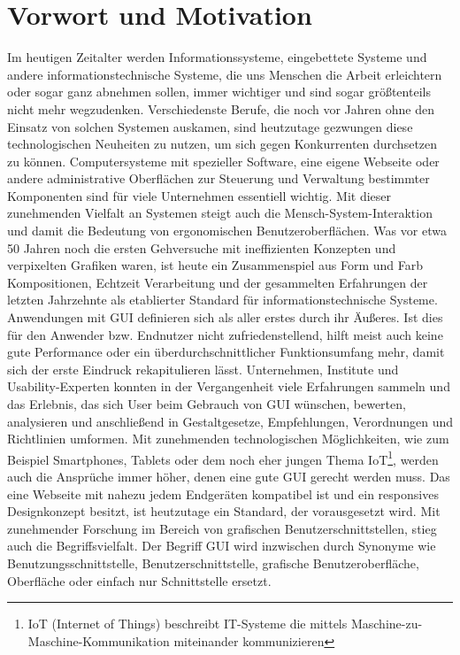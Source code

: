 \section{Vorwort und Motivation}

Im heutigen Zeitalter werden Informationssysteme, eingebettete Systeme und andere informationstechnische Systeme, die uns Menschen die Arbeit erleichtern oder sogar ganz abnehmen sollen, immer wichtiger und sind sogar größtenteils nicht mehr wegzudenken. Verschiedenste Berufe, die noch vor Jahren ohne den Einsatz von solchen Systemen auskamen, sind heutzutage gezwungen diese technologischen Neuheiten zu nutzen, um sich gegen Konkurrenten durchsetzen zu können. Computersysteme mit spezieller Software, eine eigene Webseite oder andere administrative Oberflächen zur Steuerung und Verwaltung bestimmter Komponenten sind für viele Unternehmen essentiell wichtig. Mit dieser zunehmenden Vielfalt an Systemen steigt auch die Mensch-System-Interaktion und damit die Bedeutung von ergonomischen Benutzeroberflächen. Was vor etwa 50 Jahren noch die ersten Gehversuche mit ineffizienten Konzepten und verpixelten Grafiken waren, ist heute ein Zusammenspiel aus Form und Farb Kompositionen, Echtzeit Verarbeitung und der gesammelten Erfahrungen der letzten Jahrzehnte als etablierter Standard für informationstechnische Systeme. Anwendungen mit \gls{GUI} definieren sich als aller erstes durch ihr Äußeres. Ist dies für den Anwender bzw. Endnutzer nicht zufriedenstellend, hilft meist auch keine gute Performance oder ein überdurchschnittlicher Funktionsumfang mehr, damit sich der erste Eindruck rekapitulieren lässt. Unternehmen, Institute und Usability-Experten konnten in der Vergangenheit viele Erfahrungen sammeln und das Erlebnis, das sich User beim Gebrauch von \gls{GUI} wünschen, bewerten, analysieren und anschließend in Gestaltgesetze, Empfehlungen, Verordnungen und Richtlinien umformen. Mit zunehmenden technologischen Möglichkeiten, wie zum Beispiel Smartphones, Tablets oder dem noch eher jungen Thema IoT\footnote{IoT (Internet of Things) beschreibt IT-Systeme die mittels Maschine-zu-Maschine-Kommunikation miteinander kommunizieren}, werden auch die Ansprüche immer höher, denen eine gute \gls{GUI} gerecht werden muss. Das eine Webseite mit nahezu jedem Endgeräten kompatibel ist und ein responsives Designkonzept besitzt, ist heutzutage ein Standard, der vorausgesetzt wird. Mit zunehmender Forschung im Bereich von grafischen Benutzerschnittstellen, stieg auch die Begriffsvielfalt. Der Begriff \gls{GUI} wird inzwischen durch Synonyme wie Benutzungsschnittstelle, Benutzerschnittstelle, grafische Benutzeroberfläche, Oberfläche oder einfach nur Schnittstelle ersetzt.

